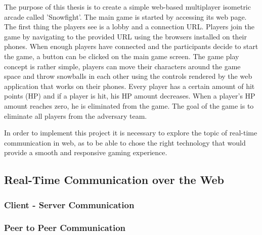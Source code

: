 The purpose of this thesis is to create a simple web-based multiplayer
isometric arcade called 'Snowfight'. The main game is started by accessing its
web page. The first thing the players see is a lobby and a connection URL.
Players join the game by navigating to the provided URL using the browsers
installed on their phones. When enough players have connected and the
participants decide to start the game, a button can be clicked on the main
game screen. The game play concept is rather simple, players can move their
characters around the game space and throw snowballs in each other using the
controls rendered by the web application that works on their phones. Every
player has a certain amount of hit points (HP) and if a player is hit, his HP
amount decreases. When a player's HP amount reaches zero, he is eliminated
from the game. The goal of the game is to eliminate all players from the
adversary team.

In order to implement this project it is necessary to explore the topic of
real-time communication in web, as to be able to chose the right technology
that would provide a smooth and responsive gaming experience.




\subsection{Real-Time Communication over the Web} %

\subsubsection{Client - Server Communication} %

\subsubsection{Peer to Peer Communication} %





